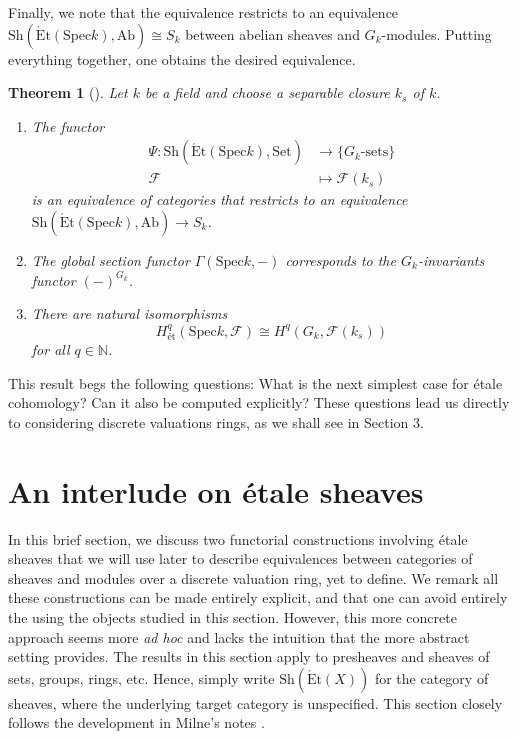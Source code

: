 \documentclass{article}
\newcommand{\Spec}{\mathrm{Spec}}
\newcommand{\Ab}{\mathrm{Ab}}
\newcommand{\Set}{\mathrm{Set}}
\newcommand{\Et}{\acute{\mathrm{E}}\mathrm{t}}
\newcommand{\Sh}{\mathrm{Sh}}
\newcommand{\N}{\mathbb{N}}
\theoremstyle{plain}
\newtheorem{theorem}{Theorem}[section]
\theoremstyle{definition}
\begin{document}
    Finally, we note that the equivalence restricts to an equivalence $\Sh(\Et(\Spec k),\Ab)\cong S_k$ between abelian sheaves and $G_k$-modules. Putting everything together, one obtains the desired equivalence. 


    \begin{theorem}[{\cite[Theorem 6.4.6]{Poonen}}]\label{thm:etalespeck}
        Let $k$ be a field and choose a separable closure $k_s$ of $k$. 
        \begin{enumerate}
        \item The functor
        \begin{align*}
            \Psi:\Sh(\Et(\Spec k),\Set) & \longrightarrow \{G_k\text{-sets}\} \\ \mathcal{F}  & \longmapsto \mathcal{F} (k_s) 
        \end{align*}
        is an equivalence of categories that restricts to an equivalence $\Sh(\Et(\Spec k),\Ab)\rightarrow S_k$.
        \item The global section functor $\Gamma(\Spec k,-)$ corresponds to the $G_k$-invariants functor $(-)^{G_k}$. 
        \item There are natural isomorphisms 
        \[ H^q_{\text{\'et}}(\Spec k, \mathcal{F} ) \cong H^q(G_k, \mathcal{F} (k_s)) \] 
        for all $q \in \N$. 
        \end{enumerate}
    \end{theorem}

    This result begs the following questions: What is the next simplest case for \'{e}tale cohomology? Can it also be computed explicitly? These questions lead us directly to considering discrete valuations rings, as we shall see in Section 3. 

    \section{An interlude on \'{e}tale sheaves}
    In this brief section, we discuss two functorial constructions involving \'{e}tale sheaves that we will use later to describe equivalences between categories of sheaves and modules over a discrete valuation ring, yet to define. We remark all these constructions can be made entirely explicit, and that one can avoid entirely the using the objects studied in this section. However, this more concrete approach seems more \textit{ad hoc} and lacks the intuition that the more abstract setting provides. The results in this section apply to presheaves and sheaves of sets, groups, rings, etc. Hence, simply write $\Sh(\Et(X))$ for the category of sheaves, where the underlying target category is unspecified. This section closely follows the development in Milne's notes \cite[\S8]{milneLEC}.
\end{document}
